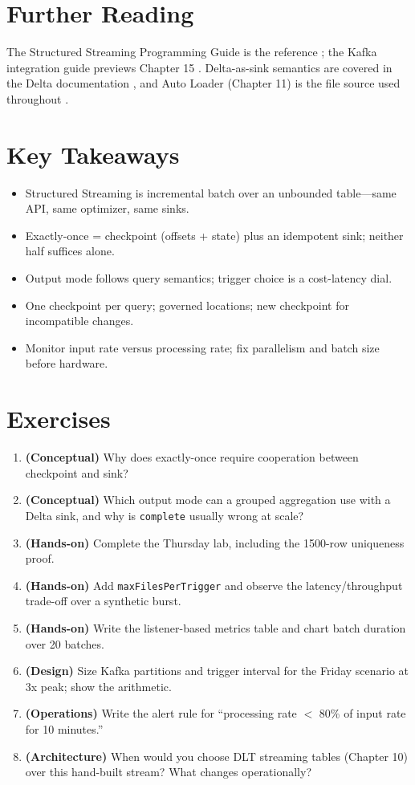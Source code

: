 \section{Further Reading}
The Structured Streaming Programming Guide is the reference \cite{sparkStructuredStreaming}; the Kafka integration guide previews Chapter 15 \cite{sparkKafkaIntegration}. Delta-as-sink semantics are covered in the Delta documentation \cite{deltaLakeDocs,databricksDelta}, and Auto Loader (Chapter 11) is the file source used throughout \cite{databricksAutoLoader}.

\section*{Key Takeaways}
\begin{itemize}
    \item Structured Streaming is incremental batch over an unbounded table---same API, same optimizer, same sinks.
    \item Exactly-once = checkpoint (offsets + state) plus an idempotent sink; neither half suffices alone.
    \item Output mode follows query semantics; trigger choice is a cost-latency dial.
    \item One checkpoint per query; governed locations; new checkpoint for incompatible changes.
    \item Monitor input rate versus processing rate; fix parallelism and batch size before hardware.
\end{itemize}

\section{Exercises}
\begin{enumerate}
    \item \textbf{(Conceptual)} Why does exactly-once require cooperation between checkpoint and sink?
    \item \textbf{(Conceptual)} Which output mode can a grouped aggregation use with a Delta sink, and why is \texttt{complete} usually wrong at scale?
    \item \textbf{(Hands-on)} Complete the Thursday lab, including the 1500-row uniqueness proof.
    \item \textbf{(Hands-on)} Add \texttt{maxFilesPerTrigger} and observe the latency/throughput trade-off over a synthetic burst.
    \item \textbf{(Hands-on)} Write the listener-based metrics table and chart batch duration over 20 batches.
    \item \textbf{(Design)} Size Kafka partitions and trigger interval for the Friday scenario at 3x peak; show the arithmetic.
    \item \textbf{(Operations)} Write the alert rule for ``processing rate $<$ 80\% of input rate for 10 minutes.''
    \item \textbf{(Architecture)} When would you choose DLT streaming tables (Chapter 10) over this hand-built stream? What changes operationally?
\end{enumerate}
